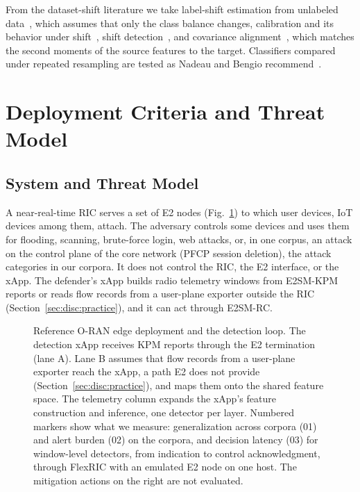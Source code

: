 \documentclass{ieeeaccess}
\begin{document}
From the dataset-shift literature we take label-shift estimation from unlabeled data~\cite{saerens2002adjusting,lipton2018bbse}, which assumes that only the class balance changes, calibration and its behavior under shift~\cite{guo2017calibration,ovadia2019trust,fawcett2007pav}, shift detection~\cite{rabanser2019failing}, and covariance alignment~\cite{sun2016coral}, which matches the second moments of the source features to the target. Classifiers compared under repeated resampling are tested as Nadeau and Bengio recommend~\cite{nadeau2003inference}.

\section{Deployment Criteria and Threat Model}
\label{sec:criteria}

\subsection{System and Threat Model}

A near-real-time RIC serves a set of E2 nodes (Fig.~\ref{fig:arch}) to which user devices, IoT devices among them, attach. The adversary controls some devices and uses them for flooding, scanning, brute-force login, web attacks, or, in one corpus, an attack on the control plane of the core network (PFCP session deletion), the attack categories in our corpora. It does not control the RIC, the E2 interface, or the xApp. The defender's xApp builds radio telemetry windows from E2SM-KPM reports or reads flow records from a user-plane exporter outside the RIC (Section~\ref{sec:disc:practice}), and it can act through E2SM-RC.

\begin{figure}[t]
\centering
\resizebox{0.97\textwidth}{!}{}
\caption{Reference O-RAN edge deployment and the detection loop. The detection xApp receives KPM reports through the E2 termination (lane A). Lane B assumes that flow records from a user-plane exporter reach the xApp, a path E2 does not provide (Section~\ref{sec:disc:practice}), and maps them onto the shared feature space. The telemetry column expands the xApp's feature construction and inference, one detector per layer. Numbered markers show what we measure: generalization across corpora (01) and alert burden (02) on the corpora, and decision latency (03) for window-level detectors, from indication to control acknowledgment, through FlexRIC with an emulated E2 node on one host. The mitigation actions on the right are not evaluated.}
\label{fig:arch}
\end{figure}
\end{document}
